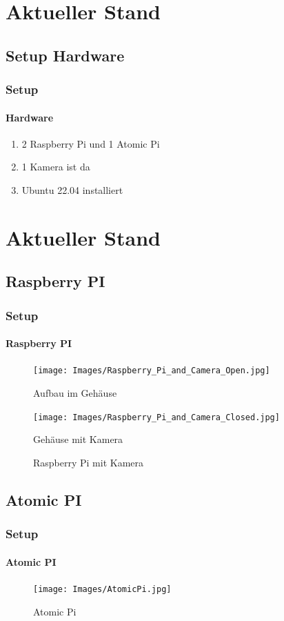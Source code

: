 \documentclass[]{beamer}
\begin{document}
\section{Aktueller Stand}
\subsection{Setup Hardware}
\begin{frame}
	\frametitle{Setup}
	\framesubtitle{Hardware}
	\begin{enumerate}
		\item 2  Raspberry Pi und 1 Atomic Pi
		\item 1 Kamera ist da
		\item Ubuntu 22.04 installiert
	\end{enumerate}
\end{frame}


\section{Aktueller Stand}
\subsection{Raspberry PI}
\begin{frame}
	\frametitle{Setup}
	\framesubtitle{Raspberry PI}
	\begin{figure}
		\centering
		\begin{minipage}[t]{0.45\textwidth}
			\centering
			\texttt{[image: Images/Raspberry\_Pi\_and\_Camera\_Open.jpg]}
			\caption*{Aufbau im Gehäuse}
		\end{minipage}
		\hfill
		\begin{minipage}[t]{0.45\textwidth}
			\centering
			\texttt{[image: Images/Raspberry\_Pi\_and\_Camera\_Closed.jpg]}
			\caption*{Gehäuse mit Kamera}
		\end{minipage}
		\hfill
		\caption{Raspberry Pi mit Kamera}
		\label{fig:Raspberry PI}
	\end{figure}
\end{frame}

\subsection{Atomic PI}
\begin{frame}
	\frametitle{Setup}
	\framesubtitle{Atomic PI}
	\begin{figure}
		\centering
		\begin{minipage}[t]{1\textwidth}
			\centering
			\texttt{[image: Images/AtomicPi.jpg]}
		\end{minipage}
		\caption{Atomic Pi}
		\label{fig:Atomic Pi}
	\end{figure}
\end{frame}
\end{document}
